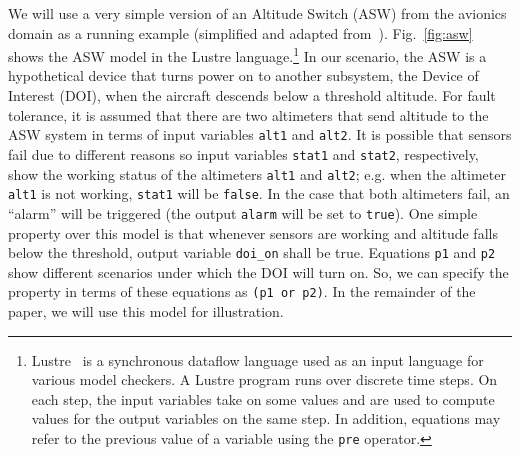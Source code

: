We will use a very simple version of an Altitude Switch (ASW) from the avionics domain as a running example (simplified and adapted from~\cite{HCW02:ase-deviation}).
Fig.~\ref{fig:asw} shows the ASW model in the Lustre language.\footnote{Lustre~\cite{Halbwachs91:lustre} is a synchronous dataflow language
used as an input language for various model checkers. A Lustre program runs over discrete
time steps. On each step, the input variables take on some values and
are used to compute values for the output variables on the same step.
In addition, equations may refer to the previous value of a variable
using the \small{{\tt pre}} operator.} In our scenario, the ASW is a hypothetical device that turns power on to another subsystem, the Device of Interest (DOI), when the aircraft descends below a threshold altitude.
For fault tolerance, it is assumed that there are two altimeters that send altitude to the ASW system in terms of input variables \texttt{alt1} and \texttt{alt2}.
It is possible that sensors fail due to different reasons so input variables \texttt{stat1} and \texttt{stat2}, respectively, show the working status of the altimeters \texttt{alt1} and \texttt{alt2}; e.g. when the altimeter \texttt{alt1} is not working, \texttt{stat1} will be \texttt{false}. In the case that both altimeters fail, an ``alarm'' will be triggered (the output \texttt{alarm} will be set to \texttt{true}).
One simple property over this model is that whenever sensors are working and altitude falls below the threshold, output variable \texttt{doi\_on} shall be true. Equations \texttt{p1} and \texttt{p2} show different scenarios under which the DOI will turn on. So, we can specify the property in terms of these equations as \texttt{(p1 or p2)}.
In the remainder of the paper, we will use this model for illustration.
